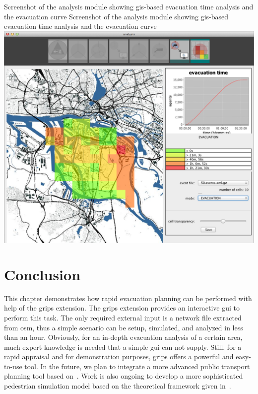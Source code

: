 \createfigure%
{Screenshot of the analysis module showing \protect\gls{gis}-based evacuation time analysis and the evacuation curve}%
{Screenshot of the analysis module showing \protect\gls{gis}-based evacuation time analysis and the evacuation curve}%
{\label{chap:evac:fig:analysis}}%
{\includegraphics[width=1\textwidth]{extending/figures/Evacuation/it50_evac_time}}
{}

\section{Conclusion}
\label{grips:outlook}
This chapter demonstrates how rapid evacuation planning can be performed with help of the \gls{grips} extension. The \gls{grips} extension provides an interactive \gls{gui} to perform this task.
The only required external input is a network file extracted from \gls{osm}, thus a simple scenario can be setup, simulated, and analyzed in less than an hour. Obviously, for an in-depth evacuation analysis of a certain area, much expert knowledge is needed that a simple \gls{gui} can not supply. Still, for a rapid appraisal and for demonstration purposes, \gls{grips} offers a powerful and easy-to-use tool. In the future, we plan to integrate a more advanced public transport planning tool based on~\citet{Neumann_PhDThesis_2014}. Work is also ongoing to develop a more sophisticated pedestrian simulation model based on the theoretical framework given in~\citet{00FloetteroedLaemmel2014BiPedFnd}.

